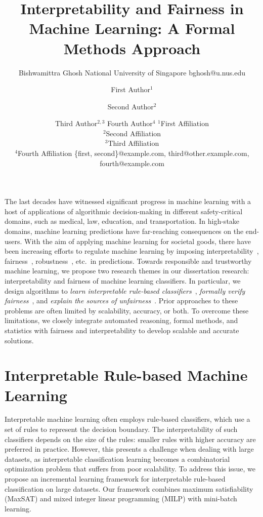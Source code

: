 \documentclass{article}
\title{Interpretability and Fairness in Machine Learning: A Formal Methods Approach}
\author{
    Bishwamittra Ghosh
    \affiliations
    National University of Singapore
    \emails
   bghosh@u.nus.edu
}
\author{
First Author$^1$
\and
Second Author$^2$\and
Third Author$^{2,3}$\And
Fourth Author$^4$
\affiliations
$^1$First Affiliation\\
$^2$Second Affiliation\\
$^3$Third Affiliation\\
$^4$Fourth Affiliation
\emails
\{first, second\}@example.com,
third@other.example.com,
fourth@example.com
}
\begin{document}
\maketitle


The last decades have witnessed significant progress in machine learning with a host of applications of algorithmic decision-making in different safety-critical domains, such as medical, law, education, and transportation. In high-stake domains,  machine learning predictions have far-reaching consequences on the end-users. With the aim of applying machine learning for societal goods, there have been increasing efforts to regulate machine learning by imposing interpretability~\cite{rudin2019stop}, fairness~\cite{barocas2017fairness}, robustness~\cite{rauber2017foolbox},  etc.\ in predictions. Towards responsible and trustworthy machine learning, we propose two research themes in our dissertation research: interpretability and fairness of machine learning classifiers. In particular, we design algorithms to \textit{learn interpretable rule-based classifiers}~\cite{ghosh22efficient,ghosh2019incremental,ghosh2020classification}, \textit{formally verify fairness}~\cite{ghosh2021justicia,ghosh2022algorithmic}, and \textit{explain the sources of unfairness}~\cite{ghosh2022how}. Prior approaches to these problems are often limited by scalability, accuracy, or both. To overcome these limitations, we closely integrate automated reasoning, formal methods, and statistics with fairness and interpretability to develop scalable and accurate solutions.


\section{Interpretable Rule-based Machine Learning}

Interpretable machine learning often employs rule-based classifiers, which use a set of rules to represent the decision boundary. The interpretability of such classifiers depends on the size of the rules: smaller rules with higher accuracy are preferred in practice. However, this presents a challenge when dealing with large datasets, as interpretable classification learning becomes a combinatorial optimization problem that suffers from poor scalability. To address this issue, we propose an incremental learning framework for interpretable rule-based classification on large datasets. Our framework combines maximum satisfiability (MaxSAT) and mixed integer linear programming (MILP) with mini-batch learning.
\end{document}
